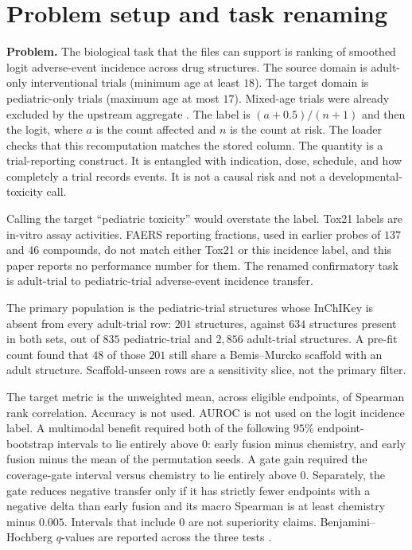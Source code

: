 \documentclass[10pt]{article}
\begin{document}
\section{Problem setup and task renaming}
\label{sec:problem}

\textbf{Problem.}
The biological task that the files can support is ranking of smoothed logit adverse-event incidence across drug structures.
The source domain is adult-only interventional trials (minimum age at least $18$).
The target domain is pediatric-only trials (maximum age at most $17$).
Mixed-age trials were already excluded by the upstream aggregate \citep{clinicaltrials}.
The label is $(a+0.5)/(n+1)$ and then the logit, where $a$ is the count affected and $n$ is the count at risk.
The loader checks that this recomputation matches the stored column.
The quantity is a trial-reporting construct.
It is entangled with indication, dose, schedule, and how completely a trial records events.
It is not a causal risk and not a developmental-toxicity call.

Calling the target ``pediatric toxicity'' would overstate the label.
Tox21 labels are in-vitro assay activities.
FAERS reporting fractions, used in earlier probes of $137$ and $46$ compounds, do not match either Tox21 or this incidence label, and this paper reports no performance number for them.
The renamed confirmatory task is adult-trial to pediatric-trial adverse-event incidence transfer.

The primary population is the pediatric-trial structures whose InChIKey \citep{heller2015inchi} is absent from every adult-trial row: $201$ structures, against $634$ structures present in both sets, out of $835$ pediatric-trial and $2{,}856$ adult-trial structures.
A pre-fit count found that $48$ of those $201$ still share a Bemis--Murcko scaffold with an adult structure.
Scaffold-unseen rows are a sensitivity slice, not the primary filter.

The target metric is the unweighted mean, across eligible endpoints, of Spearman rank correlation.
Accuracy is not used.
AUROC is not used on the logit incidence label.
A multimodal benefit required both of the following $95\%$ endpoint-bootstrap intervals to lie entirely above $0$: early fusion minus chemistry, and early fusion minus the mean of the permutation seeds.
A gate gain required the coverage-gate interval versus chemistry to lie entirely above $0$.
Separately, the gate reduces negative transfer only if it has strictly fewer endpoints with a negative delta than early fusion and its macro Spearman is at least chemistry minus $0.005$.
Intervals that include $0$ are not superiority claims.
Benjamini--Hochberg $q$-values are reported across the three tests \citep{benjamini1995fdr}.
\end{document}
